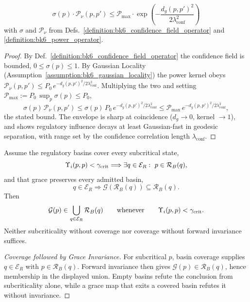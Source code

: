 \begin{theorem}
\label{theorem:bk6_confidence_power_bound}
\begin{equation}
\sigma(p) \cdot \mathcal{P}_\nu(p, p') \leq \mathcal{P}_{\max} \cdot \exp\left(-\frac{d_g(p,p')^2}{2\lambda_{\text{conf}}^2}\right)
\end{equation}
with \(\sigma\) and \(\mathcal{P}_\nu\) from Defs.~\ref{definition:bk6_confidence_field_operator} and \ref{definition:bk6_power_operator}.
\end{theorem}
\begin{proof}
\label{proof:bk6_confidence_power_bound}
\leavevmode
By Def.~\ref{definition:bk6_confidence_field_operator} the confidence field is bounded, $0\le\sigma(p)\le 1$. By Gaussian Locality (Assumption~\ref{assumption:bk6_gaussian_locality}) the power kernel obeys $\mathcal{P}_\nu(p,p')\le P_0\,e^{-d_g(p,p')^2/2\lambda_{\text{conf}}^2}$. Multiplying the two and setting $\mathcal{P}_{\max}:=P_0\,\sup_p\sigma(p)\le P_0$,
\[
\sigma(p)\,\mathcal{P}_\nu(p,p')\le\sigma(p)\,P_0\,e^{-d_g(p,p')^2/2\lambda_{\text{conf}}^2}\le\mathcal{P}_{\max}\,e^{-d_g(p,p')^2/2\lambda_{\text{conf}}^2},
\]
the stated bound. The envelope is sharp at coincidence ($d_g\to 0$, kernel $\to 1$), and shows regulatory influence decays at least Gaussian-fast in geodesic separation, with range set by the confidence correlation length $\lambda_{\text{conf}}$.
\end{proof}

\begin{lemma}
\label{lemma:bk6_grace_basin_correspondence}
Assume the regulatory basins cover every subcritical state,
\[
 \Upsilon_i(p,p)<\gamma_{\rm crit}
 \Longrightarrow
 \exists q\in\mathcal E_R:\ p\in\mathcal R_B(q),
\]
and that grace preserves every admitted basin,
\[
 q\in\mathcal E_R
 \Longrightarrow
 \mathcal G(\mathcal R_B(q))\subseteq\mathcal R_B(q).
\]
Then
\[
 \mathcal{G}(p)\in\bigcup_{q\in\mathcal E_R}\mathcal R_B(q)
 \qquad\text{whenever}\qquad
 \Upsilon_i(p,p)<\gamma_{\rm crit}.
\]
Neither subcriticality without coverage nor coverage without forward
invariance suffices.
\end{lemma}
\begin{proof}[Coverage followed by Grace Invariance]
\label{proof:bk6_grace_basin_correspondence}
\leavevmode
For subcritical $p$, basin coverage supplies $q\in\mathcal E_R$ with
$p\in\mathcal R_B(q)$.  Forward invariance then gives
$\mathcal G(p)\in\mathcal R_B(q)$, hence membership in the displayed union.
Empty basins refute the conclusion from subcriticality alone, while a grace
map that exits a covered basin refutes it without invariance.
\end{proof}

